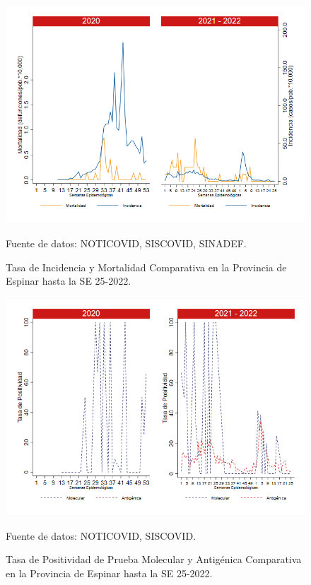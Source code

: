\documentclass[12pt,a4paper,openany]{book}
\begin{document}
	\begin{figure}[h]
		\caption{Tasa de Incidencia y Mortalidad Comparativa en la Provincia de Espinar hasta la SE 25-2022.}\label{fig:inc_mort_espinar}
		\begin{center}
			\includegraphics[width=0.85\linewidth]{../figuras/incidencia_mortalidad_20_21_8.png}
		\end{center}
		{\footnotesize {Fuente de datos: NOTICOVID, SISCOVID, SINADEF.}}
	\end{figure}
	
	\begin{figure}[h]
		\caption{Tasa de Positividad de Prueba Molecular y Antigénica Comparativa en la Provincia de Espinar hasta la SE 25-2022.}\label{fig:positividad_espinar}
		\begin{center}
			\includegraphics[width=0.7\linewidth]{../figuras/positividad_20_21_8.png}
		\end{center}
		{\footnotesize {Fuente de datos: NOTICOVID, SISCOVID.}}
	\end{figure}
	
\end{document}
